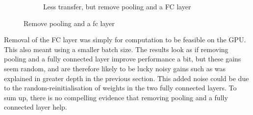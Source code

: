 \documentclass[a4paper,11pt]{article}
\begin{document}
\begin{figure}
\begin{minipage}[b]{\textwidth}
\begin{subfigure}{.5\textwidth}
        \caption{Less transfer, but remove pooling and a FC layer}\label{fig:2b}
      \end{subfigure} \par \vspace*{20pt} %
      \caption{Remove pooling and a fc layer}\label{fig:2}
    \end{minipage}%
    \label{f55}
\end{figure}

Removal of the FC layer was simply for computation to be feasible on the GPU. This also meant using a smaller batch size. The results look as if removing pooling and a fully connected layer improve performance a bit, but these gains seem random, and are therefore likely to be lucky noisy gains such as was explained in greater depth in the previous section. This added noise could be due to the random-reinitialisation of weights in the two fully connected layers. To sum up, there is no compelling evidence that removing pooling and a fully connected layer help.
\end{document}
